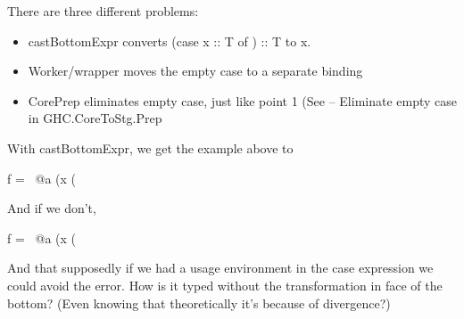 \documentclass[a4paper, draft]{report}
\begin{document}
There are three different problems:

\begin{itemize}
\item castBottomExpr converts (case x :: T of {}) :: T to x.
\item Worker/wrapper moves the empty case to a separate binding
\item CorePrep eliminates empty case, just like point 1 (See -- Eliminate empty
    case in GHC.CoreToStg.Prep
\end{itemize}

With castBottomExpr, we get the example above to
\begin{code}
    f = \ @a (x (%
\end{code}
And if we don't, 
\begin{code}
    f = \ @a (x (%
\end{code}
And that supposedly if we had a usage environment in the case expression we
could avoid the error. How is it typed without the transformation in face
of the bottom? (Even knowing that theoretically it's because of divergence?)



\end{document}
